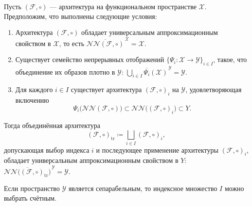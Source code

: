 \documentclass[../NDCNNAI_main.tex]{subfiles}
\begin{document}
\begin{theorem}
\label{thm:transport_uap}
Пусть $(\mathcal{F},\circ)$ --- архитектура на функциональном пространстве $\mathcal{X}$.
Предположим, что выполнены следующие условия:
\begin{enumerate}
\item[(A1)]
Архитектура $(\mathcal{F},\circ)$ обладает универсальным аппроксимационным
свойством в $\mathcal{X}$, то есть $\overline{\mathcal{NN}(\mathcal{F},\circ)}^{\,\mathcal{X}}=\mathcal{X}$.

\item[(A2)]
Существует семейство непрерывных отображений $\{\Psi_i\colon \mathcal{X}\to \mathcal{Y}\}_{i\in I}$,
такое, что объединение их образов плотно в $\mathcal{Y}$: $\overline{\bigcup_{i\in I}\Psi_i(\mathcal{X})}^{\,\mathcal{Y}}=\mathcal{Y}$.

\item[(A3)]
Для каждого $i\in I$ существует архитектура $(\mathcal{F},\circ)_i$ на $\mathcal{Y}$,
удовлетворяющая включению
\[
\Psi_i\bigl(\mathcal{NN}(\mathcal{F},\circ)\bigr)
\subset
\mathcal{NN}\bigl((\mathcal{F},\circ)_i\bigr)
\subset Y.
\]
\end{enumerate}

Тогда объединённая архитектура
\[
(\mathcal{F},\circ)_{\mathrm{tr}}
\coloneq
\bigsqcup_{i\in I}(\mathcal{F},\circ)_i,
\]
допускающая выбор индекса $i$ и последующее применение архитектуры
$(\mathcal{F},\circ)_i$, обладает универсальным аппроксимационным свойством в $Y$: $\overline{\mathcal{NN}\bigl((\mathcal{F},\circ)_{\mathrm{tr}}\bigr)}^{\,\mathcal{Y}} = \mathcal{Y}$.

Если пространство $\mathcal{Y}$ является сепарабельным, то индексное множество $I$ можно
выбрать счётным.
\end{theorem}
\end{document}
